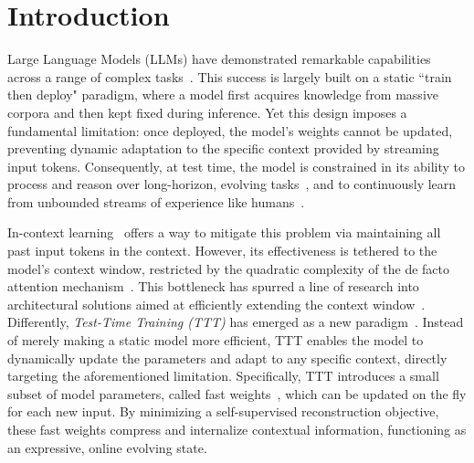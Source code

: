
\section{Introduction}

\label{sec:intro}

Large Language Models (LLMs) have demonstrated remarkable capabilities across a range of complex tasks~\citep{brown2020language,chowdhery2022palm,touvron2023llama,openai2024gpt4}. This success is largely built on a static ``train then deploy" paradigm, where a model first acquires knowledge from massive corpora and then kept fixed during inference. Yet this design imposes a fundamental limitation: once deployed, the model’s weights cannot be updated, preventing dynamic adaptation to the specific context provided by streaming input tokens. Consequently, at test time, the model is constrained in its ability to process and reason over long-horizon, evolving tasks~\citep{chan2024mle,starace2025paperbench}, and to continuously learn from unbounded streams of experience like humans~\citep{silver2025welcome}.

In-context learning~\citep{brown2020language,wei2023chainofthoughtpromptingelicitsreasoning} offers a way to mitigate this problem via maintaining all past input tokens in the context. However, its effectiveness is tethered to the model's context window, restricted by the quadratic complexity of the de facto attention mechanism~\citep{vaswani2017attention}. This bottleneck has spurred a line of research into architectural solutions aimed at efficiently extending the context window~\citep{beltagy2020longformer,peng2023yarn,child2019generating,dao2023mamba}. Differently, \textit{Test-Time Training (TTT)} has emerged as a new paradigm~\citep{sun2020ttt,wang2021tent,sun2024tttLayers,behrouz2024titans,yau2025sequentialparalleldualityprefixscannable}. Instead of merely making a static model more efficient, TTT enables the model to dynamically update the parameters and adapt to any specific context, directly targeting the aforementioned limitation. Specifically, TTT introduces a small subset of model parameters, called fast weights~\citep{schlag2021linear}, which can be updated on the fly for each new input. By minimizing a self-supervised reconstruction objective, these fast weights compress and internalize contextual information, functioning as an expressive, online evolving state. 

